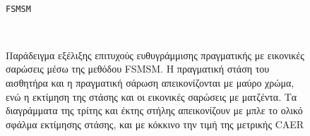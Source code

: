 \begin{figure}
  \begin{subfigure}{\linewidth}\hspace{-0.25cm}
    
  \end{subfigure}\\%
  \begin{center}\vspace{-0.5cm}
    \hfill \texttt{FSMSM}\vspace{-0.5cm}
  \end{center}
  \begin{framed}
    \begin{subfigure}{\linewidth}\hspace{-0.25cm}
    
    \end{subfigure}\\%
  \end{framed}
  \begin{subfigure}{\linewidth}\hspace{-0.25cm}
    
  \end{subfigure}%
  \caption{\small Παράδειγμα εξέλιξης επιτυχούς ευθυγράμμισης πραγματικής με
           εικονικές σαρώσεις μέσω της μεθόδου FSMSM. Η πραγματική στάση του
           αισθητήρα και η πραγματική σάρωση απεικονίζονται με μαύρο χρώμα, ενώ
           η εκτίμηση της στάσης και οι εικονικές σαρώσεις με ματζέντα. Τα
           διαγράμματα της τρίτης και έκτης στήλης απεικονίζουν με μπλε το
           ολικό σφάλμα εκτίμησης στάσης, και με κόκκινο την τιμή της μετρικής
           CAER}
  \label{fig:02_04_06:02}
\end{figure}

